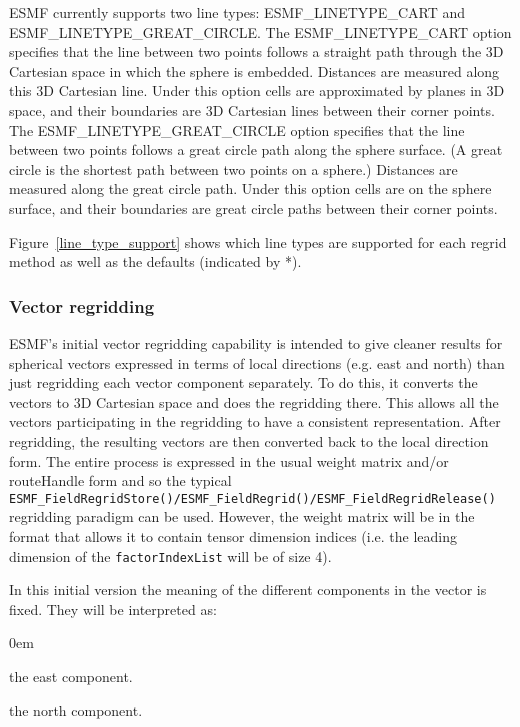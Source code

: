 ESMF currently supports two line types: ESMF\_LINETYPE\_CART and ESMF\_LINETYPE\_GREAT\_CIRCLE. The ESMF\_LINETYPE\_CART option 
specifies that the line between two points follows a straight path through the 3D Cartesian space in which the sphere is embedded.
Distances are measured along 
this 3D Cartesian line. Under this option cells are approximated by planes in 3D space, and their boundaries are 3D Cartesian lines
between their corner points.  The ESMF\_LINETYPE\_GREAT\_CIRCLE option specifies that the line between two points follows
a great circle path along the sphere surface. (A great circle is the shortest path between two points on a sphere.) 
Distances are measured along the great circle path. Under this option cells are on the sphere surface, and their boundaries 
are great circle paths between their corner points. 

Figure~\ref{line_type_support} shows which line types are supported for each regrid method as well as the defaults (indicated by *).


\subsubsection{Vector regridding}\label{sec::vectorRegrid}

ESMF's initial vector regridding capability is intended to give cleaner results for spherical vectors expressed in
terms of local directions (e.g. east and north) than just regridding each vector component separately. To do this, it
converts the vectors to 3D Cartesian space and does the regridding there. This allows all the vectors participating in
the regridding to have a consistent representation. After regridding, the resulting vectors are then converted
back to the local direction form. The entire process is expressed in the usual weight matrix and/or routeHandle form and so
the typical {\tt ESMF\_FieldRegridStore()/ESMF\_FieldRegrid()/ESMF\_FieldRegridRelease()} regridding paradigm can be used.
However, the weight matrix will be in the format that allows it to contain tensor dimension indices (i.e. the leading
dimension of the {\tt factorIndexList} will be of size 4). 

In this initial version the meaning of the different components in the vector is fixed. They will be interpreted as:
\begin{description}
  \itemsep0em
  \item[1st component] the east component.
  \item[2nd component] the north component.
\end{description}

